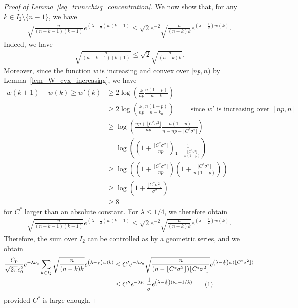 \documentclass[10pt,a4paper]{amsart}
\newcommand\numberthis{\addtocounter{equation}{1}\tag{\theequation}}
\begin{document}
\begin{proof}[Proof of Lemma~\ref{leq_truncchisq_concentration}]
We now show that, for any $k \in I_2 \setminus \{n-1\}$, we have
\begin{align*}
    \sqrt{\frac{n}{(n-k-1)(k+1)}} e^{\left(\lambda - \frac{1}{2}\right)w(k+1)} \leq \sqrt{2} e^{-2} \sqrt{\frac{n}{(n-k)k}} e^{\left(\lambda - \frac{1}{2}\right)w(k)}.
\end{align*}
Indeed, we have
\begin{align*}
    \sqrt{\frac{n}{(n-k-1)(k+1)}}  \leq \sqrt{2}\sqrt{\frac{n}{(n-k)k}}.  
\end{align*}
Moreover, since the function $w$ is increasing and convex over $[np,n)$ by Lemma~\ref{lem_W_cvx_increasing}, we have 
\begin{align*}
    w(k+1) - w(k)\geq w'(k) &\geq  2 \log\left(\frac{k}{np} \frac{n(1-p)}{n-k}\right)\\
    & \geq 2 \log\left(\frac{k_0}{np} \frac{n(1-p)}{n-k_0}\right) \qquad \text{ since $w'$ is increasing over }[np,n]\\
    & \geq \log\left(\frac{np + \lfloor C^*\sigma^2 \rfloor}{np} \frac{n(1-p)}{n-np - \lfloor C^*\sigma^2 \rfloor}\right)\\
    & = \log\left(\left(1 + \frac{\lfloor C^*\sigma^2 \rfloor}{np} \right)\frac{1}{1 - \frac{\lfloor C^*\sigma^2 \rfloor}{n (1-p)}}\right)\\
    & \geq \log\left(\left(1 + \frac{\lfloor C^*\sigma^2 \rfloor}{np} \right)\left(1 + \frac{\lfloor C^*\sigma^2 \rfloor}{n (1-p)}\right)\right)\\
    & \geq \log \left(1+\frac{\lfloor C^*\sigma^2 \rfloor}{\sigma^2}\right)\\
    & \geq 8
\end{align*}
for $C^*$ larger than an absolute constant. 
For $\lambda \leq 1/4$, we therefore obtain
\begin{align*}
    \sqrt{\frac{n}{(n-k-1)(k+1)}} e^{\left(\lambda - \frac{1}{2}\right)w(k+1)} \leq \sqrt{2} e^{-2} \sqrt{\frac{n}{(n-k)k}} e^{\left(\lambda - \frac{1}{2}\right)w(k)}.
\end{align*}
Therefore, the sum over $I_2$ can be controlled as by a geometric series, and we obtain 
\begin{align*}
    \frac{C_0}{\sqrt{2\pi}c_0^2} e^{-\lambda \nu_a} \sum_{k \in I_2} \sqrt{\frac{n}{(n-k)k}} e^{\left(\lambda - \frac{1}{2}\right)w(k)} & \leq C' e^{-\lambda \nu_a} \sqrt{\frac{n}{(n-\lfloor C^* \sigma^2 \rfloor)\lfloor C^* \sigma^2 \rfloor}} e^{\left(\lambda - \frac{1}{2}\right)w(\lfloor C^* \sigma^2 \rfloor)}\\
    & \leq C'' e^{-\lambda \nu_a} \frac{1}{\sigma} e^{\left(\lambda - \frac{1}{2}\right)\left(\nu_a + 1/\lambda\right)}\numberthis\label{eq_thirn_term_I2}
\end{align*}
provided $C^*$ is large enough. 


\end{proof}
\end{document}
